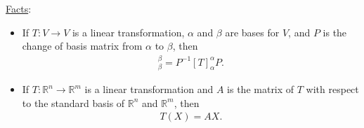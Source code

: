 \documentclass[12pt,a4paper]{article}
\begin{document}
	\newpage
	
	\phantom{222}
	
	\vfill
	
	\underline{Facts}:
	
	\begin{itemize}
	\item If $T : V \rightarrow V$ is a linear transformation, $\alpha$ and $\beta$ are bases for $V$, and $P$ is the change of basis matrix from $\alpha$ to $\beta$, then
		\begin{align*}
		[T]_\beta^\beta = P^{-1} [T]_\alpha^\alpha P .
		\end{align*}
	\item If $T : \mathbb{R}^n \rightarrow \mathbb{R}^m$ is a linear transformation and $A$ is the matrix of $T$ with respect to the standard basis of $\mathbb{R}^n$ and $\mathbb{R}^m$, then
		\begin{align*}
		T (X) = A X .
		\end{align*}
	\end{itemize}
	
\end{document}
